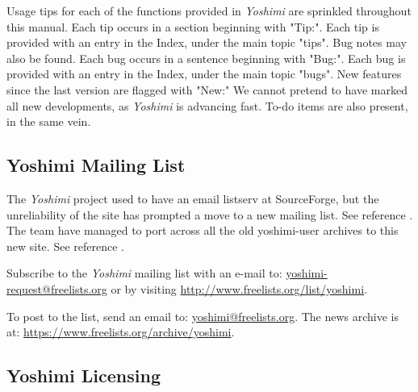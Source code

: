 \documentclass[
 11pt,
 twoside,
 a4paper,
 final                                 %
]{article}
\begin{document}
   Usage tips
   for each of the functions provided in
   \textsl{Yoshimi} are sprinkled throughout this manual.
   Each tip occurs in a section beginning with "Tip:".
   Each tip is provided with an entry in the Index, under the
   main topic "tips".
   Bug notes may also be found.
   Each bug occurs in a sentence beginning with "Bug:".  Each bug is
   provided with an entry in the Index, under the main topic "bugs".
   New features
   since the last version are flagged with "New:"  We cannot pretend to have
   marked all new developments, as \textsl{Yoshimi} is advancing fast.
   To-do items are also present, in the same vein.

\subsection{Yoshimi Mailing List}
\label{subsec:introduction_mailing_list}

   The \textsl{Yoshimi} project used to have an email listserv at
   SourceForge, but the unreliability of the site has prompted a move to a
   new mailing list.  See reference \cite{yoshiminews}.  The team have
   managed to port across all the old yoshimi-user archives to this new
   site.  See reference \cite{yoshiminewsarchive}.

   Subscribe to the \textsl{Yoshimi} mailing list with an e-mail to:
   \url{yoshimi-request@freelists.org} or by visiting
   \url{http://www.freelists.org/list/yoshimi}.

   To post to the list, send an email to: \url{yoshimi@freelists.org}.
   The news archive is at: \url{https://www.freelists.org/archive/yoshimi}.

\subsection{Yoshimi Licensing}
\label{subsec:introduction_yoshimi_licensing}
\end{document}
